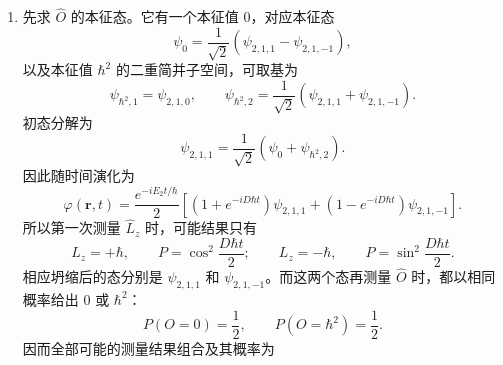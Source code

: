 \begin{question}
\begin{solution}
\begin{enumerate}[label=(\arabic*),leftmargin=2.5em]
  \item 先求 $\hat O$ 的本征态。它有一个本征值 $0$，对应本征态
  \[
  \psi_{0}=\frac{1}{\sqrt2}(\psi_{2,1,1}-\psi_{2,1,-1}),
  \]
  以及本征值 $\hbar^2$ 的二重简并子空间，可取基为
  \[
  \psi_{\hbar^2,1}=\psi_{2,1,0},
  \qquad
  \psi_{\hbar^2,2}=\frac{1}{\sqrt2}(\psi_{2,1,1}+\psi_{2,1,-1}).
  \]
  初态分解为
  \[
  \psi_{2,1,1}=\frac{1}{\sqrt2}(\psi_0+\psi_{\hbar^2,2}).
  \]
  因此随时间演化为
  \[
  \varphi(\mathbf r,t)=\frac{e^{-iE_2 t/\hbar}}{2}
  \left[(1+e^{-iD\hbar t})\psi_{2,1,1}+(1-e^{-iD\hbar t})\psi_{2,1,-1}\right].
  \]
  所以第一次测量 $\hat L_z$ 时，可能结果只有
  \[
  L_z=+\hbar,\qquad P=\cos^2\frac{D\hbar t}{2};
  \qquad
  L_z=-\hbar,\qquad P=\sin^2\frac{D\hbar t}{2}.
  \]
  相应坍缩后的态分别是 $\psi_{2,1,1}$ 和 $\psi_{2,1,-1}$。而这两个态再测量 $\hat O$ 时，都以相同概率给出 $0$ 或 $\hbar^2$：
  \[
  P(O=0)=\frac12,
  \qquad
  P(O=\hbar^2)=\frac12.
  \]
  因而全部可能的测量结果组合及其概率为
\end{enumerate}
\end{solution}
\end{question}

